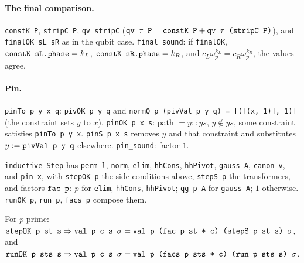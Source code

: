\paragraph{The final comparison.} \textnormal{\texttt{constK P}}, \textnormal{\texttt{stripC P}}, \textnormal{\texttt{qv\_\allowbreak{}stripC}}
($\textnormal{\texttt{qv \ensuremath{\tau} P}} = \textnormal{\texttt{constK P}} + \textnormal{\texttt{qv \ensuremath{\tau} (\allowbreak{}stripC P)}}$), and \textnormal{\texttt{finalOK sL sR}} as in the
qubit case. \textnormal{\texttt{final\_\allowbreak{}sound}}: if \textnormal{\texttt{finalOK}}, $\textnormal{\texttt{constK sL.\allowbreak{}phase}} = k_L$,
$\textnormal{\texttt{constK sR.\allowbreak{}phase}} = k_R$, and $c_L\omega_p^{k_L} = c_R\omega_p^{k_R}$, the values agree.

\paragraph{Pin.} \textnormal{\texttt{pinTo p y x q}}: \textnormal{\texttt{pivOK p y q}} and \textnormal{\texttt{normQ p (\allowbreak{}pivVal p y q) = [(\allowbreak{}[(\allowbreak{}x,\allowbreak{} 1)],\allowbreak{} 1)]}}
(the constraint sets $y$ to $x$). \textnormal{\texttt{pinOK p x s}}: path $=y::ys$, $y\notin ys$, some constraint
satisfies \textnormal{\texttt{pinTo p y x}}. \textnormal{\texttt{pinS p x s}} removes $y$ and that constraint and substitutes
$y := \textnormal{\texttt{pivVal p y q}}$ elsewhere. \textnormal{\texttt{pin\_\allowbreak{}sound}}: factor $1$.

\begin{definition}
\textnormal{\texttt{inductive Step}} has \textnormal{\texttt{perm l}}, \textnormal{\texttt{norm}}, \textnormal{\texttt{elim}}, \textnormal{\texttt{hhCons}}, \textnormal{\texttt{hhPivot}},
\textnormal{\texttt{gauss A}}, \textnormal{\texttt{canon v}}, and \textnormal{\texttt{pin x}}, with \textnormal{\texttt{stepOK p}} the side conditions above,
\textnormal{\texttt{stepS p}} the transformers, and factors $\textnormal{\texttt{fac p}}$: $p$ for \textnormal{\texttt{elim}}, \textnormal{\texttt{hhCons}},
\textnormal{\texttt{hhPivot}}; \textnormal{\texttt{qg p A}} for \textnormal{\texttt{gauss A}}; $1$ otherwise. \textnormal{\texttt{runOK p}}, \textnormal{\texttt{run p}},
\textnormal{\texttt{facs p}} compose them.
\end{definition}
\begin{theorem}
For $p$ prime: $\textnormal{\texttt{stepOK p st s}}\Rightarrow\textnormal{\texttt{val p c s \ensuremath{\sigma}}} = \textnormal{\texttt{val p (\allowbreak{}fac p st * c) (\allowbreak{}stepS p st s) \ensuremath{\sigma}}}$,
and $\textnormal{\texttt{runOK p sts s}}\Rightarrow\textnormal{\texttt{val p c s \ensuremath{\sigma}}} = \textnormal{\texttt{val p (\allowbreak{}facs p sts * c) (\allowbreak{}run p sts s) \ensuremath{\sigma}}}$.
\end{theorem}

